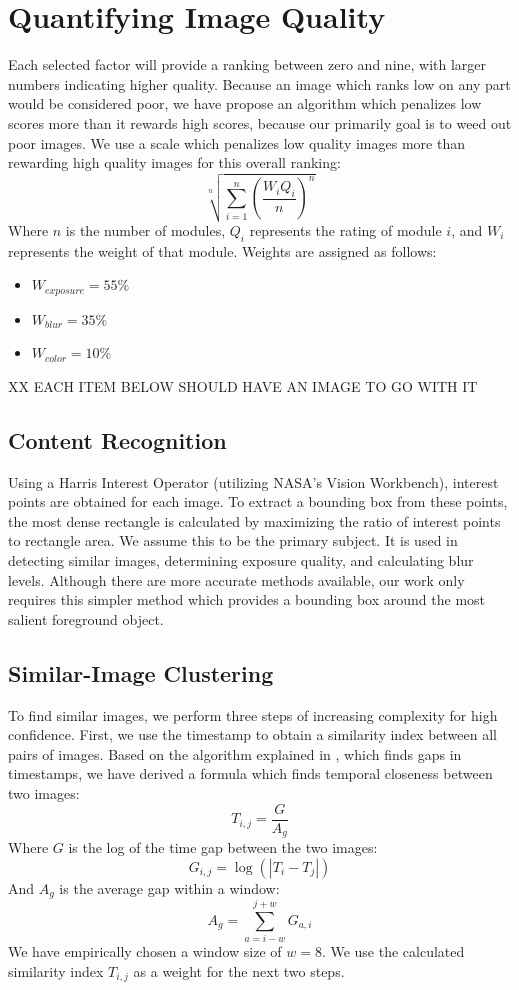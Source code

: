 \documentclass[twocolumn]{article}
\begin{document}
\section{Quantifying Image Quality}
Each selected factor will provide a ranking between zero and nine, with larger numbers indicating higher quality. Because an image which ranks low on any part would be considered poor, we have propose an algorithm which penalizes low scores more than it rewards high scores, because our primarily goal is to weed out poor images. We use a scale which penalizes low quality images more than rewarding high quality images for this overall ranking:
\[
\sqrt[n]{\displaystyle\sum\limits_{i=1}^n(\frac{W_iQ_i}{n})^n}
\]
Where \(n\) is the number of modules, \(Q_i\) represents the rating of module \(i\), and \(W_i\) represents the weight of that module. Weights are assigned as follows:
\begin{itemize}
\item \(W_{exposure}=55\%\)
\item \(W_{blur}=35\%\)
\item \(W_{color}=10\%\)
\end{itemize}

XX EACH ITEM BELOW SHOULD HAVE AN IMAGE TO GO WITH IT

\subsection{Content Recognition}
Using a Harris Interest Operator (utilizing NASA's Vision Workbench\cite{vision-workbench}), interest points are obtained for each image. To extract a bounding box from these points, the most dense rectangle is calculated by maximizing the ratio of interest points to rectangle area. We assume this to be the primary subject. It is used in detecting similar images, determining exposure quality, and calculating blur levels. Although there are more accurate methods available\cite{5649226}, our work only requires this simpler method which provides a bounding box around the most salient foreground object.

\subsection{Similar-Image Clustering}
To find similar images, we perform three steps of increasing complexity for high confidence.
First, we use the timestamp to obtain a similarity index between all pairs of images. Based on the algorithm explained in \cite{1292402}, which finds gaps in timestamps, we have derived a formula which finds temporal closeness between two images:
\[
T_{i,j}=\frac{G}{A_g}
\]
Where \(G\) is the log of the time gap between the two images:
\[
G_{i,j}=\log(|T_i-T_j|)
\]
And \(A_g\) is the average gap within a window:
\[
A_g=\displaystyle\sum\limits_{a={i-w}}^{j+w}G_{a,i}
\]
We have empirically chosen a window size of \(w=8\).
We use the calculated similarity index \(T_{i,j}\) as a weight for the next two steps.
\end{document}
